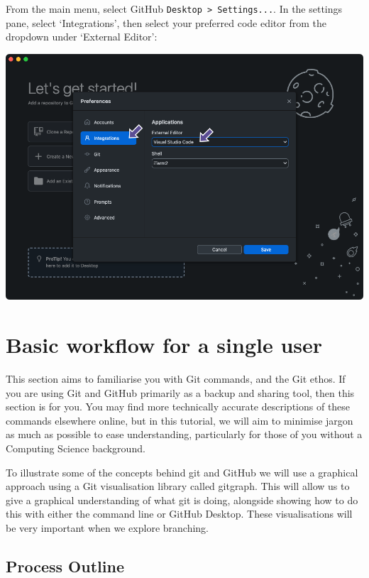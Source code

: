 \documentclass[
  letterpaper,
  DIV=11,
  numbers=noendperiod]{scrartcl}
\begin{document}
From the main menu, select GitHub
\texttt{Desktop\ \textgreater{}\ Settings...}. In the settings pane,
select `Integrations', then select your preferred code editor from the
dropdown under `External Editor':

\includegraphics{images/image7.png}

\section{Basic workflow for a single
user}\label{basic-workflow-for-a-single-user}

This section aims to familiarise you with Git commands, and the Git
ethos. If you are using Git and GitHub primarily as a backup and sharing
tool, then this section is for you. You may find more technically
accurate descriptions of these commands elsewhere online, but in this
tutorial, we will aim to minimise jargon as much as possible to ease
understanding, particularly for those of you without a Computing Science
background.

To illustrate some of the concepts behind git and GitHub we will use a
graphical approach using a Git visualisation library called gitgraph.
This will allow us to give a graphical understanding of what git is
doing, alongside showing how to do this with either the command line or
GitHub Desktop. These visualisations will be very important when we
explore branching.

\subsection{Process Outline}\label{process-outline}
\end{document}
